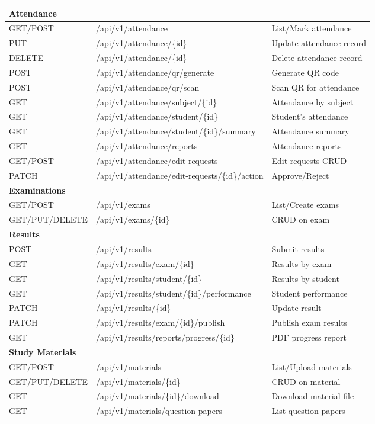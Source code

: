 \begin{longtable}{|l|p{5cm}|p{5.5cm}|}
\multicolumn{3}{|l|}{\textbf{Attendance}} \\
\hline
GET/POST & /api/v1/attendance & List/Mark attendance \\
\hline
PUT & /api/v1/attendance/\{id\} & Update attendance record \\
\hline
DELETE & /api/v1/attendance/\{id\} & Delete attendance record \\
\hline
POST & /api/v1/attendance/qr/generate & Generate QR code \\
\hline
POST & /api/v1/attendance/qr/scan & Scan QR for attendance \\
\hline
GET & /api/v1/attendance/subject/\{id\} & Attendance by subject \\
\hline
GET & /api/v1/attendance/student/\{id\} & Student's attendance \\
\hline
GET & /api/v1/attendance/student/\{id\}/summary & Attendance summary \\
\hline
GET & /api/v1/attendance/reports & Attendance reports \\
\hline
GET/POST & /api/v1/attendance/edit-requests & Edit requests CRUD \\
\hline
PATCH & /api/v1/attendance/edit-requests/\{id\}/action & Approve/Reject \\
\hline

\multicolumn{3}{|l|}{\textbf{Examinations}} \\
\hline
GET/POST & /api/v1/exams & List/Create exams \\
\hline
GET/PUT/DELETE & /api/v1/exams/\{id\} & CRUD on exam \\
\hline

\multicolumn{3}{|l|}{\textbf{Results}} \\
\hline
POST & /api/v1/results & Submit results \\
\hline
GET & /api/v1/results/exam/\{id\} & Results by exam \\
\hline
GET & /api/v1/results/student/\{id\} & Results by student \\
\hline
GET & /api/v1/results/student/\{id\}/performance & Student performance \\
\hline
PATCH & /api/v1/results/\{id\} & Update result \\
\hline
PATCH & /api/v1/results/exam/\{id\}/publish & Publish exam results \\
\hline
GET & /api/v1/results/reports/progress/\{id\} & PDF progress report \\
\hline

\multicolumn{3}{|l|}{\textbf{Study Materials}} \\
\hline
GET/POST & /api/v1/materials & List/Upload materials \\
\hline
GET/PUT/DELETE & /api/v1/materials/\{id\} & CRUD on material \\
\hline
GET & /api/v1/materials/\{id\}/download & Download material file \\
\hline
GET & /api/v1/materials/question-papers & List question papers \\
\hline


\end{longtable}
